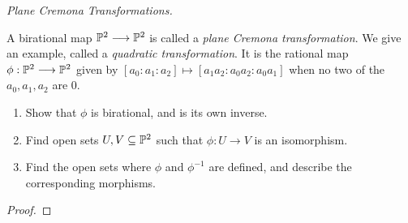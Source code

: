 \label{1.4.6}

\emph{Plane Cremona Transformations.}

A birational map $\P^2 \longrightarrow \P^2$ is called a \emph{plane Cremona transformation}. We give an example, called a \emph{quadratic transformation}. It is the rational map $\phi: \P^2 \longrightarrow \P^2$ given by $[a_0 : a_1 : a_2] \mapsto [a_1 a_2 : a_0 a_2 : a_0 a_1]$ when no two of the $a_0, a_1, a_2$ are $0$.

\begin{enumerate}[label = (\alph*)]
    \item Show that $\phi$ is birational, and is its own inverse.

    \item Find open sets $U, V \subseteq \P^2$ such that $\phi: U \longrightarrow V$ is an isomorphism.

    \item Find the open sets where $\phi$ and $\phi^{-1}$ are defined, and describe the corresponding morphisms.
\end{enumerate}


\begin{proof}

\end{proof}
